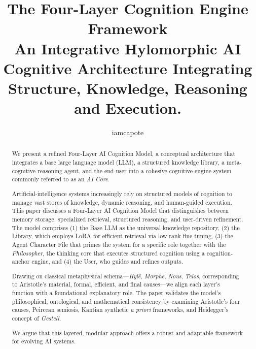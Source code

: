 \documentclass{article}
\begin{document}




\title{\textbf{The Four-Layer Cognition Engine Framework}\\ 
An Integrative Hylomorphic AI Cognitive Architecture Integrating Structure, Knowledge, Reasoning and Execution.}
\author{iamcapote}
\date{}


% 


\maketitle

\begin{abstract}
We present a refined Four-Layer AI Cognition Model, a conceptual architecture that integrates a base large language model (LLM), a structured knowledge library, a meta-cognitive reasoning agent, and the end-user into a cohesive cognitive-engine system commonly referred to as an \emph{AI Core}.

Artificial-intelligence systems increasingly rely on structured models of cognition to manage vast stores of knowledge, dynamic reasoning, and human-guided execution. This paper discusses a Four-Layer AI Cognition Model that distinguishes between memory storage, specialized retrieval, structured reasoning, and user-driven refinement. The model comprises (1) the Base LLM as the universal knowledge repository, (2) the Library, which employs LoRA for efficient retrieval via low-rank fine-tuning, (3) the Agent Character File that primes the system for a specific role together with the \textit{Philosopher}, the thinking core that executes structured cognition using a cognition-anchor engine, and (4) the User, who guides and refines outputs.

Drawing on classical metaphysical schema—\emph{Hylē}, \emph{Morphe}, \emph{Nous}, \emph{Telos}, corresponding to Aristotle’s material, formal, efficient, and final causes—we align each layer’s function with a foundational explanatory role. The paper validates the model’s philosophical, ontological, and mathematical consistency by examining Aristotle’s four causes, Peircean semiosis, Kantian synthetic \emph{a priori} frameworks, and Heidegger’s concept of \emph{Gestell}.

We argue that this layered, modular approach offers a robust and adaptable framework for evolving AI systems.
\end{abstract}
\end{document}
